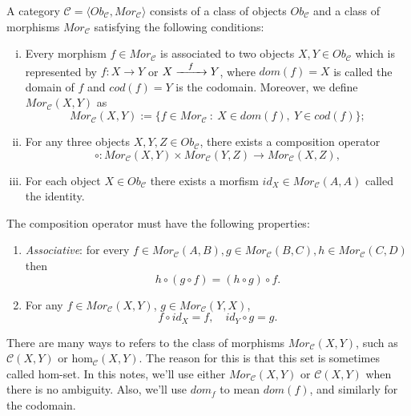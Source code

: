 \begin{definition}[Category]
	A category $\mathcal C = \langle Ob_{\mathcal C}, Mor_{\mathcal C} \rangle$ consists
	of a class of objects $Ob_\mathcal C$ and a class of morphisms
	$Mor_\mathcal C$ satisfying the following conditions:
  \begin{enumerate}[(i)]
    \item Every morphism $f \in Mor_\mathcal C$ is associated to two objects $X,Y \in Ob_{\mathcal C}$
      which is represented by $f:X \to Y$ or $X \xrightarrow{\hspace{3mm}f \hspace{3mm}} Y$,
      where $dom(f) = X$ is called the domain of $f$ and $cod(f)=Y$ is the codomain. Moreover, we define
      $Mor_\mathcal C (X,Y)$ as 
      \begin{displaymath}
        Mor_\mathcal C (X,Y) := \{f \in Mor_\mathcal C \ : \ X \in dom(f), \ Y \in cod(f)\};
      \end{displaymath}
    \item For any three objects $X,Y, Z \in Ob_\mathcal C$, there exists a composition operator
      \begin{displaymath}
        \circ: Mor_\mathcal C (X,Y)   \times Mor_\mathcal C (Y,Z) \to Mor_\mathcal C (X,Z),
      \end{displaymath}
      \item For each object $X \in Ob_\mathcal C$ there exists a morfism $id_X \in Mor_\mathcal C (A,A)$
        called the identity.
  \end{enumerate}
  The composition operator must have the following properties:
  \begin{enumerate}[(p.1)]
    \item \textit{Associative}: for every $f \in Mor_\mathcal C (A,B),
      g \in Mor_\mathcal C (B,C), h \in Mor_\mathcal C (C,D)$ then
      \begin{displaymath}
        h \circ (g \circ f) = (h \circ g) \circ f.
      \end{displaymath}
    \item For any $f \in Mor_\mathcal C (X,Y)$, $g \in Mor_\mathcal C (Y,X)$, 
      \begin{displaymath}
        f \circ id_X = f,  \quad id_Y \circ g = g.
      \end{displaymath}
  \end{enumerate}
\end{definition}

There are many ways to refers to the class of morphisms $Mor_\mathcal C (X,Y)$, such as
$\mathcal C(X,Y)$ or $\text{hom}_\mathcal C (X,Y)$. The reason for this is that
this set is sometimes called hom-set. In this notes, we'll use either $Mor_\mathcal C (X,Y)$
or $\mathcal C (X,Y)$ when there is no ambiguity. Also, we'll use $dom_f$ to mean $dom(f)$,
and similarly for the codomain.


